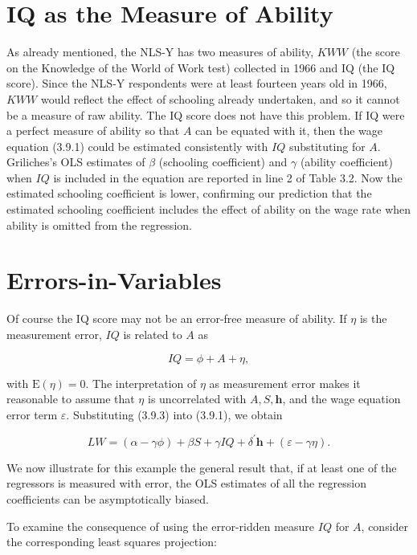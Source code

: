 \documentclass[10pt]{article}
\begin{document}
\section*{IQ as the Measure of Ability}
As already mentioned, the NLS-Y has two measures of ability, $K W W$ (the score on the Knowledge of the World of Work test) collected in 1966 and IQ (the IQ score). Since the NLS-Y respondents were at least fourteen years old in 1966, $K W W$ would reflect the effect of schooling already undertaken, and so it cannot be a measure of raw ability. The IQ score does not have this problem. If IQ were a perfect measure of ability so that $A$ can be equated with it, then the wage equation (3.9.1) could be estimated consistently with $I Q$ substituting for $A$. Griliches's OLS estimates of $\beta$ (schooling coefficient) and $\gamma$ (ability coefficient) when $I Q$ is included in the equation are reported in line 2 of Table 3.2. Now the estimated schooling coefficient is lower, confirming our prediction that the estimated schooling coefficient includes the effect of ability on the wage rate when ability is omitted from the regression.

\section*{Errors-in-Variables}
Of course the IQ score may not be an error-free measure of ability. If $\eta$ is the measurement error, $I Q$ is related to $A$ as


\begin{equation*}
I Q=\phi+A+\eta, \tag{3.9.3}
\end{equation*}


with $\mathrm{E}(\eta)=0$. The interpretation of $\eta$ as measurement error makes it reasonable to assume that $\eta$ is uncorrelated with $A, S, \mathbf{h}$, and the wage equation error term $\varepsilon$. Substituting (3.9.3) into (3.9.1), we obtain


\begin{equation*}
L W=(\alpha-\gamma \phi)+\beta S+\gamma I Q+\delta^{\prime} \mathbf{h}+(\varepsilon-\gamma \eta) . \tag{3.9.4}
\end{equation*}


We now illustrate for this example the general result that, if at least one of the regressors is measured with error, the OLS estimates of all the regression coefficients can be asymptotically biased.

To examine the consequence of using the error-ridden measure $I Q$ for $A$, consider the corresponding least squares projection:
\end{document}
